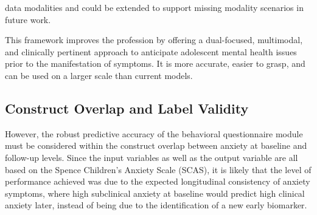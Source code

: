 \documentclass[10pt,letterpaper]{article}
\begin{document}
\begin{itemize}
                                                                                                                                                                      data modalities and could be extended to support missing modality
                                                                                                                                                                          scenarios in future work.
                                                                                                                                                                          \end{itemize}

                                                                                                                                                                          This framework improves the profession by offering a dual-focused, multimodal, and clinically pertinent approach to anticipate adolescent mental health issues prior to the manifestation of symptoms. It is more accurate, easier to grasp, and can be used on a larger scale than current models.

\subsection*{Construct Overlap and Label Validity}

However, the robust predictive accuracy of the behavioral questionnaire module must be considered within the construct overlap between anxiety at baseline and follow-up levels. Since the input variables as well as the output variable are all based on the Spence Children's Anxiety Scale (SCAS), it is likely that the level of performance achieved was due to the expected longitudinal consistency of anxiety symptoms, where high subclinical anxiety at baseline would predict high clinical anxiety later, instead of being due to the identification of a new early biomarker.
\end{document}
